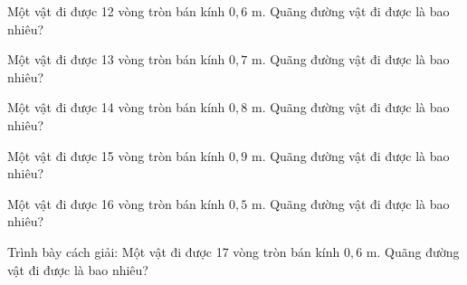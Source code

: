 \begin{ex}
Một vật đi được 12 vòng tròn bán kính $0,6$ m. Quãng đường vật đi được là bao nhiêu?
\end{ex}

\begin{ex}
Một vật đi được 13 vòng tròn bán kính $0,7$ m. Quãng đường vật đi được là bao nhiêu?
\end{ex}

\begin{ex}
Một vật đi được 14 vòng tròn bán kính $0,8$ m. Quãng đường vật đi được là bao nhiêu?
\end{ex}

\begin{ex}
Một vật đi được 15 vòng tròn bán kính $0,9$ m. Quãng đường vật đi được là bao nhiêu?
\end{ex}

\begin{ex}
Một vật đi được 16 vòng tròn bán kính $0,5$ m. Quãng đường vật đi được là bao nhiêu?
\end{ex}

\begin{bt}
Trình bày cách giải: Một vật đi được 17 vòng tròn bán kính $0,6$ m. Quãng đường vật đi được là bao nhiêu?
\end{bt}

